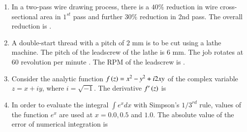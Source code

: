 \documentclass[journal,12pt,onecolumn]{IEEEtran}
\theoremstyle{remark}
\begin{document}
\begin{enumerate}
\hfill{}

\item In a two-pass wire drawing process, there is a $40\%$ reduction in wire cross-sectional area in $1^{st}$ pass and further $30\%$ reduction in 2nd pass. The overall reduction  is \underline{\hspace{2cm}}.

\hfill{}

\item A double-start thread with a pitch of $2$ mm is to be cut using a lathe machine. The pitch of the leadscrew of the lathe is $6$ mm. The job rotates at $60$ revolution per minute . The RPM of the leadscrew is \underline{\hspace{2cm}}.

\hfill{}

\item Consider the analytic function $f\left(z\right)=x^2 - y^2 + i2xy$ of the complex variable $z=x+iy$, where $i=\sqrt{-1}$. The derivative $f'\left(z\right)$ is

\hfill{}

\begin{enumerate}
\end{enumerate}

\item In order to evaluate the integral $\int e^x dx$ with Simpson's $1/3^{rd}$ rule, values of the function $e^x$ are used at $x=0.0, 0.5$ and $1.0$. The absolute value of the error of numerical integration is

\hfill{}

\begin{enumerate}
\end{enumerate}


\end{enumerate}
\end{document}
